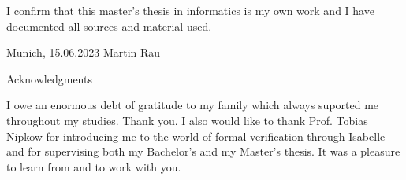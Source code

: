 \documentclass[headsepline,footsepline,footinclude=false,oneside,fontsize=11pt,paper=a4,listof=totoc,bibliography=totoc]{scrbook} %
\newcommand*{\getAuthor}{Martin Rau}
\newcommand*{\getDoctype}{Master's Thesis in Informatics}
\newcommand*{\getSubmissionDate}{15.06.2023}
\newcommand*{\getSubmissionLocation}{Munich}
\begin{document}

\thispagestyle{empty}
\vspace*{0.8\textheight}
\noindent
I confirm that this \MakeLowercase{\getDoctype{}} is my own work and I have documented all sources and material used.

\vspace{15mm}
\noindent
\getSubmissionLocation{}, \getSubmissionDate{} \hspace{50mm} \getAuthor{}

\cleardoublepage{}


%
\thispagestyle{empty}

\vspace*{20mm}

\begin{center}
{ Acknowledgments}
\end{center}

\vspace{10mm}

I owe an enormous debt of gratitude to my family which always suported me throughout my studies.
Thank you. I also would like to thank Prof. Tobias Nipkow for introducing me to the world of formal
verification through Isabelle and for supervising both my Bachelor's and my Master's thesis. It was
a pleasure to learn from and to work with you.

\cleardoublepage{}

\end{document}
